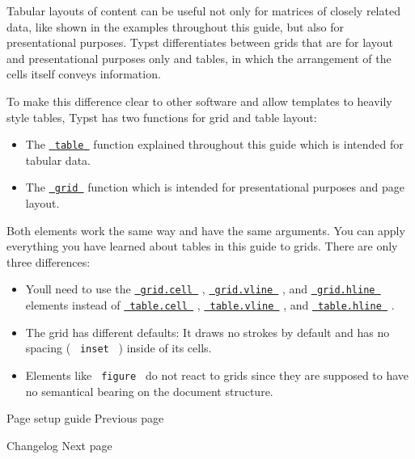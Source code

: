 Tabular layouts of content can be useful not only for matrices of
closely related data, like shown in the examples throughout this guide,
but also for presentational purposes. Typst differentiates between grids
that are for layout and presentational purposes only and tables, in
which the arrangement of the cells itself conveys information.

To make this difference clear to other software and allow templates to
heavily style tables, Typst has two functions for grid and table layout:

\begin{itemize}
\tightlist
\item
  The \href{/docs/reference/model/table/}{\texttt{\ table\ }} function
  explained throughout this guide which is intended for tabular data.
\item
  The \href{/docs/reference/layout/grid/}{\texttt{\ grid\ }} function
  which is intended for presentational purposes and page layout.
\end{itemize}

Both elements work the same way and have the same arguments. You can
apply everything you have learned about tables in this guide to grids.
There are only three differences:

\begin{itemize}
\tightlist
\item
  You\textquotesingle ll need to use the
  \href{/docs/reference/layout/grid/\#definitions-cell}{\texttt{\ grid.cell\ }}
  ,
  \href{/docs/reference/layout/grid/\#definitions-vline}{\texttt{\ grid.vline\ }}
  , and
  \href{/docs/reference/layout/grid/\#definitions-hline}{\texttt{\ grid.hline\ }}
  elements instead of
  \href{/docs/reference/model/table/\#definitions-cell}{\texttt{\ table.cell\ }}
  ,
  \href{/docs/reference/model/table/\#definitions-vline}{\texttt{\ table.vline\ }}
  , and
  \href{/docs/reference/model/table/\#definitions-hline}{\texttt{\ table.hline\ }}
  .
\item
  The grid has different defaults: It draws no strokes by default and
  has no spacing ( \texttt{\ inset\ } ) inside of its cells.
\item
  Elements like \texttt{\ figure\ } do not react to grids since they are
  supposed to have no semantical bearing on the document structure.
\end{itemize}

\href{/docs/guides/page-setup-guide/}{\pandocbounded{}}

{ Page setup guide } { Previous page }

\href{/docs/changelog/}{\pandocbounded{}}

{ Changelog } { Next page }
